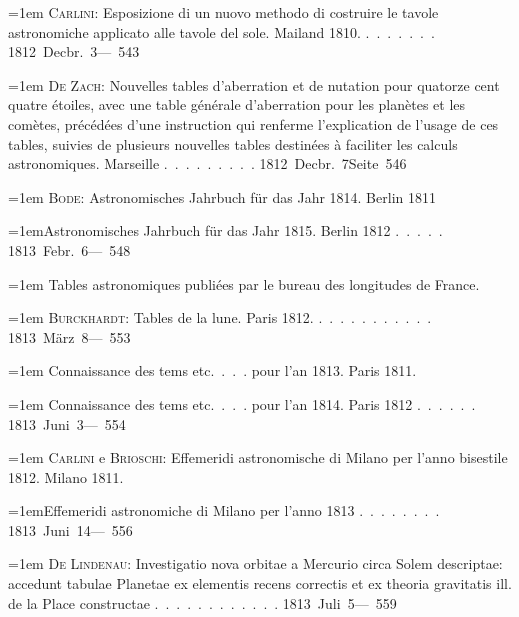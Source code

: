 \noindent\hangindent=1em \textsc{Carlini}: Esposizione di un nuovo methodo di costruire le tavole astronomiche applicato alle tavole del sole. Mailand 1810. \mbox{.\ .\ .\ .\ .\ .\ .} \hfill\mbox{1812 Decbr. 3}\quad\mbox{--- 543}\par\smallskip
\noindent\hangindent=1em \textsc{De Zach}: Nouvelles tables d'aberration et de nutation pour quatorze cent quatre étoiles, avec une table générale d'aberration pour les planètes et les comètes, précédées d'une instruction qui renferme l'explication de l'usage de ces tables, suivies de plusieurs nouvelles tables destinées à faciliter les calculs astronomiques. Marseille \mbox{.\ .\ .\ .\ .\ .\ .\ .\ .} \hfill\mbox{1812 Decbr. 7}\quad\mbox{Seite 546}\par\smallskip
\noindent\hangindent=1em \textsc{Bode}: Astronomisches Jahrbuch für das Jahr 1814. Berlin 1811\par\noindent\hangindent=1em\hspace{1em}Astronomisches Jahrbuch für das Jahr 1815. Berlin 1812 \mbox{.\ .\ .\ .\ .} \hfill\mbox{1813 Febr. 6}\quad\mbox{--- 548}\par\smallskip
\noindent\hangindent=1em Tables astronomiques publiées par le bureau des longitudes de France.\par\noindent\hangindent=1em \textsc{Burckhardt}: Tables de la lune. Paris 1812. \mbox{.\ .\ .\ .\ .\ .\ .\ .\ .\ .\ .} \hfill\mbox{1813 März 8}\quad\mbox{--- 553}\par\smallskip
\noindent\hangindent=1em Connaissance des tems etc.\ .\ .\ . pour l'an 1813. Paris 1811.\par\noindent\hangindent=1em Connaissance des tems etc.\ .\ .\ . pour l'an 1814. Paris 1812 \mbox{.\ .\ .\ .\ .\ .} \hfill\mbox{1813 Juni 3}\quad\mbox{--- 554}\par\smallskip
\noindent\hangindent=1em \textsc{Carlini} e \textsc{Brioschi}: Effemeridi astronomische di Milano per l'anno bisestile 1812. Milano 1811.\par\noindent\hangindent=1em\hspace{1em}Effemeridi astronomiche di Milano per l'anno 1813 \mbox{.\ .\ .\ .\ .\ .\ .\ .} \hfill\mbox{1813 Juni 14}\quad\mbox{--- 556}\par\smallskip
\noindent\hangindent=1em \textsc{De Lindenau}: Investigatio nova orbitae a Mercurio circa Solem descriptae: accedunt tabulae Planetae ex elementis recens correctis et ex theoria gravitatis ill. de la Place constructae \mbox{.\ .\ .\ .\ .\ .\ .\ .\ .\ .\ .\ .} \hfill\mbox{1813 Juli 5}\quad\mbox{--- 559}\par\smallskip

